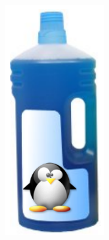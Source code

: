 \begin{frame}
\begin{columns}
    \includegraphics[width=0.9\textwidth]{slides/sysdev-kernel-building/kernel-mrproper.png}
  \end{columns}
\end{frame}

